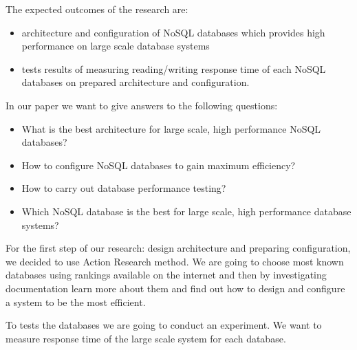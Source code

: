 \documentclass[times, 10pt,twocolumn]{article}
\begin{document}

The expected outcomes of the research are:

\begin{itemize}
  \item architecture and configuration of NoSQL databases which provides high performance on large scale database systems
  \item tests results of measuring reading/writing response time of each NoSQL databases on prepared architecture and configuration.
\end{itemize}


In our paper we want to give answers to the following questions:

\begin{itemize}
  \item What is the best architecture for large scale, high performance NoSQL databases?
  \item How to configure NoSQL databases to gain maximum efficiency?
  \item How to carry out database performance testing?
  \item Which NoSQL database is the best for large scale, high performance database systems?
\end{itemize}
 

For the first step of our research: design architecture and preparing configuration, we decided to use Action Research method.
We are going to choose most known databases using rankings available on the internet and then by investigating
documentation learn more about them and find out how to design and configure a system to be the most efficient.

To tests the databases we are going to conduct an experiment. We want to measure response time of the large scale
system for each database.

\end{document}
